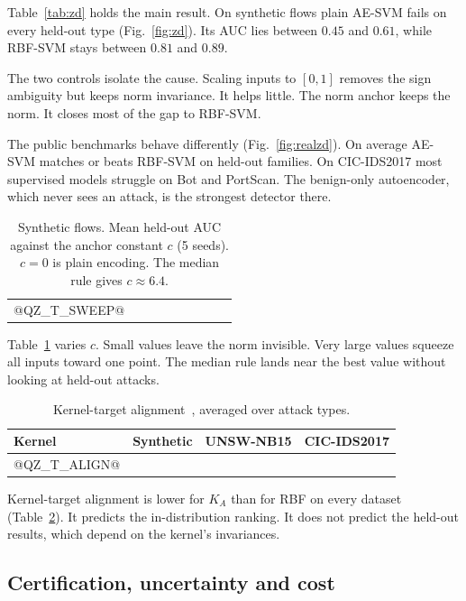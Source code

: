 \documentclass[conference,10pt]{IEEEtran}
\begin{document}
Table~\ref{tab:zd} holds the main result. On synthetic flows plain AE-SVM fails on
every held-out type (Fig.~\ref{fig:zd}). Its AUC lies between $0.45$ and $0.61$,
while RBF-SVM stays between $0.81$ and $0.89$.

The two controls isolate the cause. Scaling inputs to $[0,1]$ removes the sign
ambiguity but keeps norm invariance. It helps little. The norm anchor keeps the
norm. It closes most of the gap to RBF-SVM.

The public benchmarks behave differently (Fig.~\ref{fig:realzd}). On average
AE-SVM matches or beats RBF-SVM on held-out families. On CIC-IDS2017 most
supervised models struggle on Bot and PortScan. The benign-only autoencoder, which
never sees an attack, is the strongest detector there.

\begin{table}[t]
  \centering
  \caption{Synthetic flows. Mean held-out AUC against the anchor constant $c$ (5 seeds). $c=0$ is plain encoding. The median rule gives $c\approx6.4$.}
  \label{tab:sweep}
  \footnotesize
  \setlength{\tabcolsep}{3.5pt}
  \begin{tabular}{lcccccccc}
    \toprule
@QZ_T_SWEEP@
    \bottomrule
  \end{tabular}
\end{table}

Table~\ref{tab:sweep} varies $c$. Small values leave the norm invisible. Very
large values squeeze all inputs toward one point. The median rule lands near the
best value without looking at held-out attacks.

\begin{table}[t]
  \centering
  \caption{Kernel-target alignment~\cite{cristianini2002kernel}, averaged over attack types.}
  \label{tab:align}
  \footnotesize
  \begin{tabular}{lccc}
    \toprule
    Kernel & Synthetic & UNSW-NB15 & CIC-IDS2017 \\
    \midrule
@QZ_T_ALIGN@
    \bottomrule
  \end{tabular}
\end{table}

Kernel-target alignment is lower for $K_A$ than for RBF on every dataset
(Table~\ref{tab:align}). It predicts the in-distribution ranking. It does not
predict the held-out results, which depend on the kernel's invariances.

\subsection{Certification, uncertainty and cost}
\end{document}

